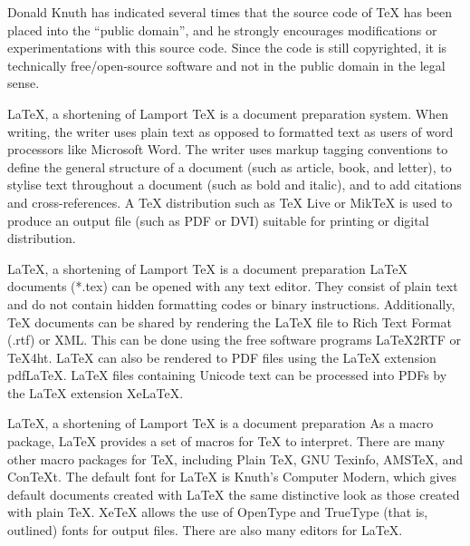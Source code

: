 \documentclass[landscape]{slides}
\begin{document}
\begin{slide}
Donald Knuth has indicated several times that the source code of TeX has
been placed into the ``public domain'', and he strongly encourages
modifications or experimentations with this source code. Since the code
is still copyrighted, it is technically free/open-source software and
not in the public domain in the legal sense.
\end{slide}

\begin{slide}
\LaTeX{}, a shortening of Lamport \TeX{} is a document preparation
system. When writing, the writer uses plain text as opposed to
formatted text as users of word processors like Microsoft Word. The
writer uses markup tagging conventions to define the general structure
of a document (such as article, book, and letter), to stylise text
throughout a document (such as bold and italic), and to add citations
and cross-references. A \TeX{} distribution such as \TeX{} Live or
MikTeX is used to produce an output file (such as PDF or DVI) suitable
for printing or digital distribution.
\end{slide}

\begin{slide}
\LaTeX{}, a shortening of Lamport \TeX{} is a document preparation
\LaTeX{} documents (*.tex) can be opened with any text editor. They
consist of plain text and do not contain hidden formatting codes or
binary instructions. Additionally, \TeX{} documents can be shared by
rendering the \LaTeX{} file to Rich Text Format (.rtf) or XML. This can
be done using the free software programs LaTeX2RTF or TeX4ht. \LaTeX{}
can also be rendered to PDF files using the \LaTeX{} extension pdfLaTeX.
\LaTeX{} files containing Unicode text can be processed into PDFs by the
\LaTeX{} extension XeLaTeX.
\end{slide}

\begin{slide}
\LaTeX{}, a shortening of Lamport \TeX{} is a document preparation
As a macro package, \LaTeX{} provides a set of macros for \TeX{} to
interpret. There are many other macro packages for \TeX{}, including
Plain \TeX{}, GNU Texinfo, AMSTeX, and ConTeXt. The default font for
\LaTeX{} is Knuth's Computer Modern, which gives default documents
created with \LaTeX{} the same distinctive look as those created with
plain \TeX{}. XeTeX allows the use of OpenType and TrueType (that is,
outlined) fonts for output files. There are also many editors for
\LaTeX{}.
\end{slide}
\end{document}
